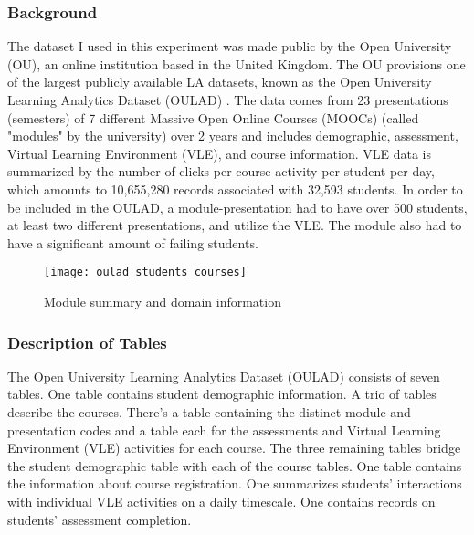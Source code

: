 \documentclass{article}
\begin{document}
        \subsubsection{Background}
            The dataset I used in this experiment was made public by the Open University (OU), an online institution based in the United Kingdom.
            The OU provisions one of the largest publicly available LA datasets, known as the Open University Learning Analytics Dataset (OULAD) \cite{oulad}.
            The data comes from 23 presentations (semesters) of 7 different Massive Open Online Courses (MOOCs) (called "modules" by the university) over 2 years and includes demographic, assessment, Virtual Learning Environment (VLE), and course information.
            VLE data is summarized by the number of clicks per course activity per student per day, which amounts to 10,655,280 records associated with 32,593 students.
            In order to be included in the OULAD, a module-presentation had to have over 500 students, at least two different presentations, and utilize the VLE.
            The module also had to have a significant amount of failing students.

            \begin{figure}
                \texttt{[image: oulad\_students\_courses]}
                \caption{Module summary and domain information \cite{oulad}}
                \label{fig:oulad_students_courses}
            \end{figure}

        \subsubsection{Description of Tables}
        
            The Open University Learning Analytics Dataset (OULAD) consists of seven tables.
            One table contains student demographic information. 
            A trio of tables describe the courses. 
            There's a table containing the distinct module and presentation codes and a table each for the assessments and Virtual Learning Environment (VLE) activities for each course.
            The three remaining tables bridge the student demographic table with each of the course tables. 
            One table contains the information about course registration.
            One summarizes students' interactions with individual VLE activities on a daily timescale.
            One contains records on students' assessment completion.
\end{document}
